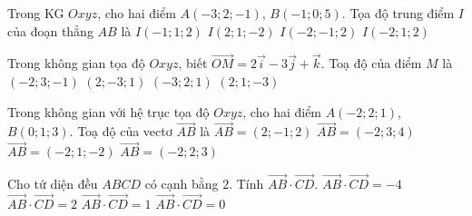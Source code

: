\begin{ex}%
 Trong KG $Oxyz$, cho hai điểm $A(-3;2;-1)$, $B(-1;0;5)$. Tọa độ trung điểm $I$ của đoạn thẳng $AB$ là
 \choice
 {$I(-1;1;2)$}
 {$I(2;1;-2)$}
 {$I(-2;-1;2)$}
 {\True $I(-2;1;2)$}
 \end{ex}

\begin{ex}%
 Trong không gian tọa độ $Oxyz$, biết $\overrightarrow{OM}=2\overrightarrow i-3\overrightarrow j+\overrightarrow k$. Toạ độ của điểm $M$ là
 \choice
 {$(-2;3;-1)$}
 {\True $(2;-3;1)$}
 {$(-3;2;1)$}
 {$(2;1;-3)$}
 \end{ex}

\begin{ex}%
 Trong không gian với hệ trục tọa độ $Oxyz$, cho hai điểm $A(-2;2;1)$, $B( 0;1;3)$. Toạ độ của vectơ $\overrightarrow{AB}$ là
 \choice
 {\True $\overrightarrow{AB}=(2;-1;2)$}
 {$\overrightarrow{AB}=(-2;3;4)$}
 {$\overrightarrow{AB}=(-2;1;-2)$}
 {$\overrightarrow{AB}=(-2;2;3)$}
 \end{ex}

\begin{ex}%
 Cho tứ diện đều $ABCD$ có cạnh bằng $2$. Tính $\overrightarrow{AB}\cdot\overrightarrow{CD}$.
 \choice
 {$\overrightarrow{AB}\cdot\overrightarrow{CD}=-4$}
 {$\overrightarrow{AB}\cdot\overrightarrow{CD}=2$}
 {$\overrightarrow{AB}\cdot\overrightarrow{CD}=1$}
 {\True $\overrightarrow{AB}\cdot\overrightarrow{CD}=0$}
 \end{ex}


